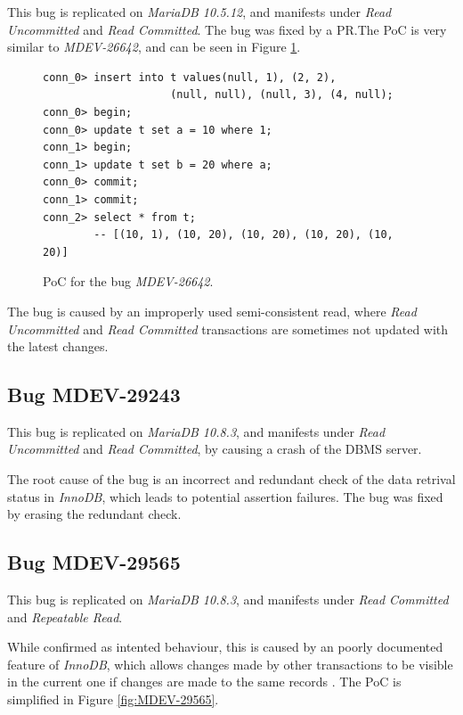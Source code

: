 This bug is replicated on \textit{MariaDB 10.5.12}, and manifests under \textit{Read Uncommitted} and \textit{Read Committed}. The bug was fixed by a PR.The PoC is very similar to \textit{MDEV-26642}, and can be seen in Figure \ref{fig:MDEV-26643}.


\begin{figure}[H]
\begin{verbatim}
conn_0> insert into t values(null, 1), (2, 2),
                    (null, null), (null, 3), (4, null);
conn_0> begin;
conn_0> update t set a = 10 where 1;
conn_1> begin;
conn_1> update t set b = 20 where a;
conn_0> commit;
conn_1> commit;
conn_2> select * from t; 
        -- [(10, 1), (10, 20), (10, 20), (10, 20), (10, 20)]
\end{verbatim}
\caption{PoC for the bug \textit{MDEV-26642}.} \label{fig:MDEV-26643}
\end{figure}

The bug is caused by an improperly used semi-consistent read, where \textit{Read Uncommitted} and \textit{Read Committed} transactions are sometimes not updated with the latest changes.

\subsection*{Bug MDEV-29243}

This bug is replicated on \textit{MariaDB 10.8.3}, and manifests under \textit{Read Uncommitted} and \textit{Read Committed}, by causing a crash of the DBMS server.

The root cause of the bug is an incorrect and redundant check of the data retrival status in \textit{InnoDB}, which leads to potential assertion failures. The bug was fixed by erasing the redundant check.

\subsection*{Bug MDEV-29565}

This bug is replicated on \textit{MariaDB 10.8.3}, and manifests under \textit{Read Committed} and \textit{Repeatable Read}.

While confirmed as intented behaviour, this is caused by an poorly documented feature of \textit{InnoDB}, which allows changes made by other transactions to be visible in the current one if changes are made to the same records \cite{mysqlconsistentread}. The PoC is simplified in Figure \ref{fig:MDEV-29565}.

